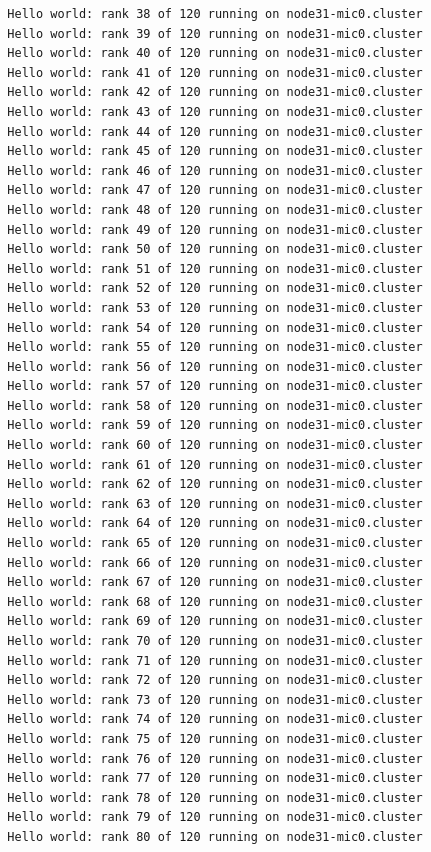 \documentclass[pscyr,10pt]{hedlab}
\begin{document}
\begin{lstlisting}
  Hello world: rank 38 of 120 running on node31-mic0.cluster
  Hello world: rank 39 of 120 running on node31-mic0.cluster
  Hello world: rank 40 of 120 running on node31-mic0.cluster
  Hello world: rank 41 of 120 running on node31-mic0.cluster
  Hello world: rank 42 of 120 running on node31-mic0.cluster
  Hello world: rank 43 of 120 running on node31-mic0.cluster
  Hello world: rank 44 of 120 running on node31-mic0.cluster
  Hello world: rank 45 of 120 running on node31-mic0.cluster
  Hello world: rank 46 of 120 running on node31-mic0.cluster
  Hello world: rank 47 of 120 running on node31-mic0.cluster
  Hello world: rank 48 of 120 running on node31-mic0.cluster
  Hello world: rank 49 of 120 running on node31-mic0.cluster
  Hello world: rank 50 of 120 running on node31-mic0.cluster
  Hello world: rank 51 of 120 running on node31-mic0.cluster
  Hello world: rank 52 of 120 running on node31-mic0.cluster
  Hello world: rank 53 of 120 running on node31-mic0.cluster
  Hello world: rank 54 of 120 running on node31-mic0.cluster
  Hello world: rank 55 of 120 running on node31-mic0.cluster
  Hello world: rank 56 of 120 running on node31-mic0.cluster
  Hello world: rank 57 of 120 running on node31-mic0.cluster
  Hello world: rank 58 of 120 running on node31-mic0.cluster
  Hello world: rank 59 of 120 running on node31-mic0.cluster
  Hello world: rank 60 of 120 running on node31-mic0.cluster
  Hello world: rank 61 of 120 running on node31-mic0.cluster
  Hello world: rank 62 of 120 running on node31-mic0.cluster
  Hello world: rank 63 of 120 running on node31-mic0.cluster
  Hello world: rank 64 of 120 running on node31-mic0.cluster
  Hello world: rank 65 of 120 running on node31-mic0.cluster
  Hello world: rank 66 of 120 running on node31-mic0.cluster
  Hello world: rank 67 of 120 running on node31-mic0.cluster
  Hello world: rank 68 of 120 running on node31-mic0.cluster
  Hello world: rank 69 of 120 running on node31-mic0.cluster
  Hello world: rank 70 of 120 running on node31-mic0.cluster
  Hello world: rank 71 of 120 running on node31-mic0.cluster
  Hello world: rank 72 of 120 running on node31-mic0.cluster
  Hello world: rank 73 of 120 running on node31-mic0.cluster
  Hello world: rank 74 of 120 running on node31-mic0.cluster
  Hello world: rank 75 of 120 running on node31-mic0.cluster
  Hello world: rank 76 of 120 running on node31-mic0.cluster
  Hello world: rank 77 of 120 running on node31-mic0.cluster
  Hello world: rank 78 of 120 running on node31-mic0.cluster
  Hello world: rank 79 of 120 running on node31-mic0.cluster
  Hello world: rank 80 of 120 running on node31-mic0.cluster

\end{lstlisting}
\end{document}
